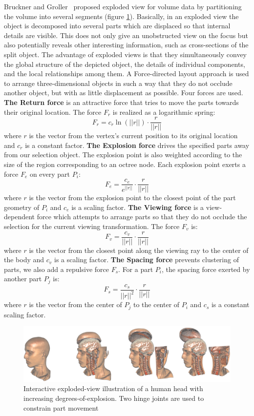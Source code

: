   Bruckner and  Groller~\cite{4015467} proposed exploded view for volume data by partitioning the volume into several segments (figure \ref{fig:exploded}). Basically, in an exploded view the object is decomposed into several parts which are displaced so that internal details are visible. This does not only give an unobstructed view on the focus but also potentially reveals other interesting information, such as
cross-sections of the split object. The advantage of exploded views is that they simultaneously convey the global structure of the depicted object, the details of individual components, and the local relationships
among them. A Force-directed layout approach is used to arrange three-dimensional objects
in such a way that they do not occlude another object, but with as little displacement as possible. Four forces are used. \textbf{The Return force } is an attractive force that tries to move the parts towards
their original location. The force $F_r$ is realized as a logarithmic spring:
 \[ F_r=c_{r}\ln(||r||)\cdot \frac{r}{||r||} \] 
 where $r$ is the vector from the vertex's current position to its original location and $c_r$ is a constant factor.
 \textbf{The Explosion force} drives the specified parts away from our selection object. The explosion point is also weighted according to the size of the region corresponding to an octree node. Each explosion point exerts a force $F_e$ on every part $P_i$:
  \[ F_e=  \frac{c_e}{e^{||r||} } \cdot \frac{r}{||r||} \]
  where $r$ is the vector from the explosion point to the closest point of the part geometry of $P_i$ and $c_e$ is a scaling factor.
   \textbf{The Viewing force} is a view-dependent force which attempts to arrange parts so that they do not occlude the selection for the current viewing transformation. The force $F_v$ is:
   \[ F_v=  \frac{c_v}{||r||} \cdot \frac{r}{||r||} \] 
   where $r$ is the vector from the closest point along the viewing ray to the center of the body and $c_v$ is a scaling factor.
   \textbf{The Spacing force} prevents clustering of parts, we also add a
repulsive force $F_s$. For a part $P_i$, the spacing force exerted by another part $P_j$ is:
\[ F_s=  \frac{c_s}{||r||^2} \cdot \frac{r}{||r||} \] 
where $r$ is the vector from the center of $P_j$ to the center of $P_i$ and
$c_s$ is a constant scaling factor. 
\begin{figure}[th]
\centering
\includegraphics[width=\textwidth]{Figures/explodedview}
\decoRule
\caption[ Interactive exploded-view]{ Interactive exploded-view illustration of a human head with increasing degrees-of-explosion. Two hinge joints are used to constrain part
movement}
\label{fig:exploded}
\end{figure}
  

